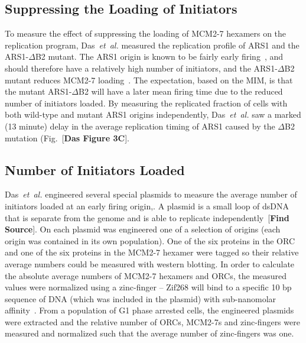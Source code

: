 		
		\subsection{Suppressing the Loading of Initiators}
		\label{subsec:SuppressingInitiators}
		
		To measure the effect of suppressing the loading of MCM2-7 hexamers on the replication program, Das~\emph{et~al.} measured the replication profile of ARS1 and the ARS1-$\Delta$B2 mutant.
		The ARS1 origin is known to be fairly early firing~\cite{OriDB}, and should therefore have a relatively high number of initiators, and the ARS1-$\Delta$B2 mutant reduces MCM2-7 loading~\cite{ARS1Mutant}.
		The expectation, based on the MIM, is that the mutant ARS1-$\Delta$B2 will have a later mean firing time due to the reduced number of initiators loaded.
		By measuring the replicated fraction of cells with both wild-type and mutant ARS1 origins independently, Das~\emph{et~al.} saw a marked (13 minute) delay in the average replication timing of ARS1 caused by the $\Delta$B2 mutation (Fig.~[\textbf{Das Figure 3C}].
		
		
		\subsection{Number of Initiators Loaded}
		\label{subsec:NoInitiatorsLoaded}
		
		Das~\emph{et~al.} engineered several special plasmids to measure the average number of initiators loaded at an early firing origin,.
		A plasmid is a small loop of dsDNA that is separate from the genome and is able to replicate independently~[\textbf{Find Source}].
		On each plasmid was engineered one of a selection of origins (each origin was contained in its own population).
		One of the six proteins in the ORC and one of the six proteins in the MCM2-7 hexamer were tagged so their relative average numbers could be measured with western blotting.
		In order to calculate the absolute average numbers of MCM2-7 hexamers and ORCs, the measured values were normalized using a zinc-finger -- Zif268 will bind to a specific 10 bp sequence of DNA (which was included in the plasmid) with sub-nanomolar affinity~\cite{ZincFingers}.
		From a population of G1 phase arrested cells, the engineered plasmids were extracted and the relative number of ORCs, MCM2-7s and zinc-fingers were measured and normalized such that the average number of zinc-fingers was one.
		
